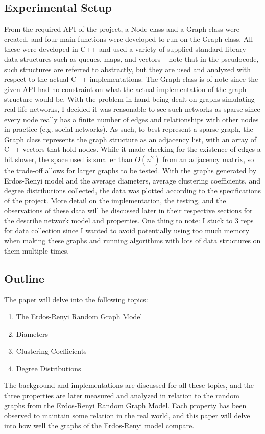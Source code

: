 \documentclass{article}
\begin{document}
\subsection{Experimental Setup}
    From the required API of the project, a Node class and a Graph class were
    created, and four main functions were developed to run on the Graph class.
    All these were developed in C++ and used a variety of supplied standard
    library data structures such as queues, maps, and vectors – note that in the
    pseudocode, such structures are referred to abstractly, but they are
    used and analyzed with respect to the actual C++ implementations.
    \nextblurb
    The Graph class is of note since the given API had no constraint on what
    the actual implementation of the graph structure would be. With the problem
    in hand being dealt on graphs simulating real life networks, I decided it 
    was reasonable to see such networks as sparse since every node really has
    a finite number of edges and relationships with other nodes in practice 
    (e.g. social networks). As such, to best represent a sparse graph, the
    Graph class represents the graph structure as an adjacency list, with an
    array of C++ vectors that hold nodes. While it made checking for the
    existence of edges a bit slower, the space used is smaller than
    $O(n^2)$ from an adjacency matrix, so the trade-off allows for larger graphs
    to be tested.
    \nextblurb
    With the graphs generated by Erdos-Renyi model and the average diameters, 
    average clustering coefficients, and degree distributions collected, the
    data was plotted according to the specifications of the project. More detail
    on the implementation, the testing, and the observations of these data will
    be discussed later in their respective sections for the describe network
    model and properties. One thing to note: I stuck to $3$ reps for data
    collection since I wanted to avoid potentially using too much memory when
    making these graphs and running algorithms with lots of data structures on
    them multiple times.
\subsection{Outline}
    The paper will delve into the following topics:
    \begin{enumerate}
        \item The Erdos-Renyi Random Graph Model
        \item Diameters
        \item Clustering Coefficients
        \item Degree Distributions
    \end{enumerate}
    \noindent The background and implementations are discussed for all these
    topics, and the three properties are later measured and analyzed in relation
    to the random graphs from the Erdos-Renyi Random Graph Model. Each property
    has been observed to maintain some relation in the real world, and this
    paper will delve into how well the graphs of the Erdos-Renyi model compare.
\end{document}
